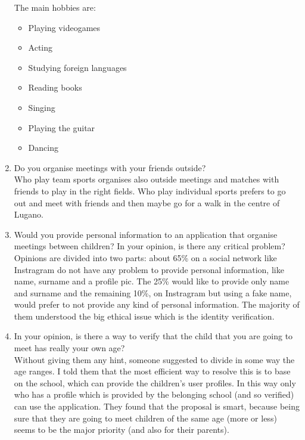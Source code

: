 \documentclass[12pt]{article}
\begin{document}
\begin{enumerate}
  The main hobbies are:
  \begin{itemize}
    \item Playing videogames
    \item Acting
    \item Studying foreign languages
    \item Reading books
    \item Singing
    \item Playing the guitar
    \item Dancing
  \end{itemize}
  \item Do you organise meetings with your friends outside? \\
  Who play team sports organises also outside meetings and matches with friends to play in the right fields.
  Who play individual sports prefers to go out and meet with friends and then maybe go for a walk in the centre of Lugano.
  \item Would you provide personal information to an application that organise meetings between children?
  In your opinion, is there any critical problem? \\
    Opinions are divided into two parts: about 65\% on a social network like Instragram do not have any problem to provide personal information, like name, surname and a profile pic. The 25\% would like to provide only
    name and surname and the remaining 10\%, on Instragram but using a fake name, would prefer to not provide any kind of personal information. The majority of them understood the big ethical issue which is the identity verification.
  \item In your opinion, is there a way to verify that the child that you are going to meet has really your own age? \\
    Without giving them any hint, someone suggested to divide in some way the age ranges. I told them that the most efficient way to resolve this is to base on the school, which can provide the children's user profiles.
    In this way only who has a profile which is provided by the belonging school (and so verified) can use the application. They found that the proposal is smart, because being sure that they are going to meet children of
    the same age (more or less) seems to be the major priority (and also for their parents).


\end{enumerate}
\end{document}
